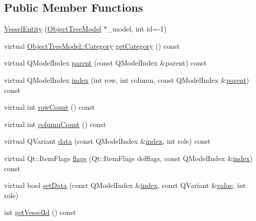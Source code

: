 \subsection*{Public Member Functions}
\begin{DoxyCompactItemize}
\item 
\mbox{\hyperlink{classobjecttree_1_1_vessel_entity_acb3421a2e649b563ed60995a3a2d35cd}{Vessel\+Entity}} (\mbox{\hyperlink{class_object_tree_model}{Object\+Tree\+Model}} $\ast$\+\_\+model, int id=-\/1)
\item 
virtual \mbox{\hyperlink{class_object_tree_model_a379e9d6b0d381853785adf62095ba4e3}{Object\+Tree\+Model\+::\+Category}} \mbox{\hyperlink{classobjecttree_1_1_vessel_entity_a25fba35cee80316cd61fd530841b2123}{get\+Category}} () const
\item 
virtual Q\+Model\+Index \mbox{\hyperlink{classobjecttree_1_1_vessel_entity_a9243c501576a63cf130cd79cd649afcf}{parent}} (const Q\+Model\+Index \&parent) const
\item 
virtual Q\+Model\+Index \mbox{\hyperlink{classobjecttree_1_1_vessel_entity_a20c7a77debdacf5dfe526c8b74557029}{index}} (int row, int column, const Q\+Model\+Index \&\mbox{\hyperlink{classobjecttree_1_1_vessel_entity_a9243c501576a63cf130cd79cd649afcf}{parent}}) const
\item 
virtual int \mbox{\hyperlink{classobjecttree_1_1_vessel_entity_a0b5216a430aa174e43ff4c8ec57d535d}{row\+Count}} () const
\item 
virtual int \mbox{\hyperlink{classobjecttree_1_1_vessel_entity_a89a8252acfb577ccf2ca5e75fa09ffb5}{column\+Count}} () const
\item 
virtual Q\+Variant \mbox{\hyperlink{classobjecttree_1_1_vessel_entity_afce0ec4f7419907bac636bdcdc531832}{data}} (const Q\+Model\+Index \&\mbox{\hyperlink{classobjecttree_1_1_vessel_entity_a20c7a77debdacf5dfe526c8b74557029}{index}}, int role) const
\item 
virtual Qt\+::\+Item\+Flags \mbox{\hyperlink{classobjecttree_1_1_vessel_entity_a9998a9efc49fd3e195bf8cd9c5936118}{flags}} (Qt\+::\+Item\+Flags defflags, const Q\+Model\+Index \&\mbox{\hyperlink{classobjecttree_1_1_vessel_entity_a20c7a77debdacf5dfe526c8b74557029}{index}}) const
\item 
virtual bool \mbox{\hyperlink{classobjecttree_1_1_vessel_entity_a3711adf359039425f969a894a0044993}{set\+Data}} (const Q\+Model\+Index \&\mbox{\hyperlink{classobjecttree_1_1_vessel_entity_a20c7a77debdacf5dfe526c8b74557029}{index}}, const Q\+Variant \&\mbox{\hyperlink{diffusion_8cpp_a4b41795815d9f3d03abfc739e666d5da}{value}}, int role)
\item 
int \mbox{\hyperlink{classobjecttree_1_1_vessel_entity_a8e45383cb111d6edb1374f9391a07513}{get\+Vessel\+Id}} () const
\end{DoxyCompactItemize}
